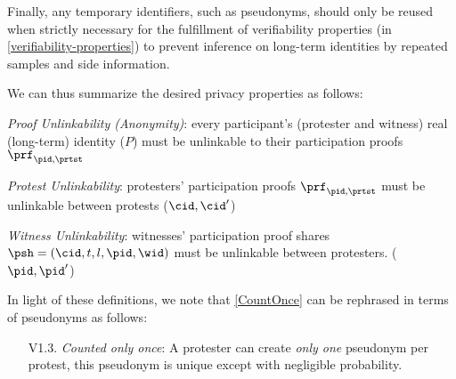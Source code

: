 


Finally, any temporary identifiers, such as pseudonyms, should only be reused 
when strictly necessary for the fulfillment of verifiability properties (in 
\cref{verifiability-properties}) to prevent inference on long-term identities 
by repeated samples and side information.

We can thus summarize the desired privacy properties as follows:
\begin{requirements}[P]
\item\label{ProofUnlink} \emph{Proof Unlinkability (Anonymity)}: every 
  participant's (protester and witness) real (long-term) identity (\(P\)) must 
  be unlinkable to their participation proofs \(\prf_{\pid, \prtst}\)
\item\label{ProtestUnlink} \emph{Protest Unlinkability}: protesters' participation proofs \(\prf_{\pid, \prtst}\) must be unlinkable between protests (\(\cid, \cid' \))
\item\label{WitnessUnlink}\emph{Witness Unlinkability}:  witnesses' participation proof shares \(\psh = (\cid, t, l, \pid,\wid)\) must be unlinkable between protesters. (\(\pid, \pid' \))
\end{requirements}

In light of these definitions, we note that \cref{CountOnce} can be rephrased 
in terms of pseudonyms as follows:
\begin{enumerate}
  \item[V1.3.] \emph{Counted only once}:
    A protester can create \emph{only one} pseudonym per protest, this 
    pseudonym is unique except with negligible probability.
\end{enumerate}

